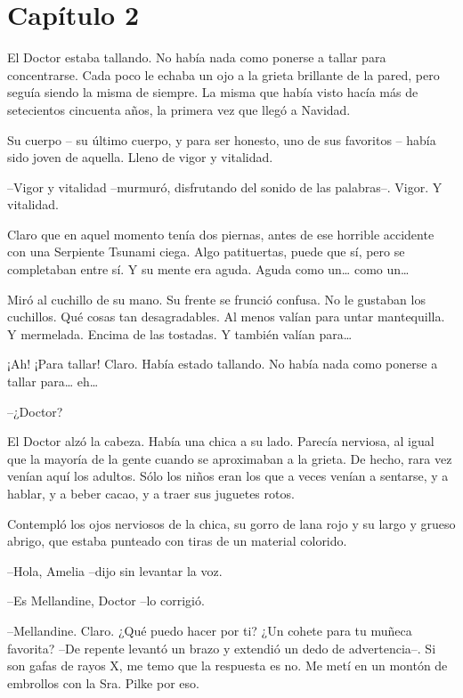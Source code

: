 \chapter*{Capítulo 2}

El Doctor estaba tallando. No había nada como ponerse a tallar para concentrarse. Cada poco le echaba un ojo a la grieta brillante de la pared, pero seguía siendo la misma de siempre. La misma que había visto hacía más de setecientos cincuenta años, la primera vez que llegó a Navidad.

Su cuerpo – su último cuerpo, y para ser honesto, uno de sus favoritos – había sido joven de aquella. Lleno de vigor y vitalidad.

--Vigor y vitalidad --murmuró, disfrutando del sonido de las palabras--. Vigor. Y vitalidad.

Claro que en aquel momento tenía dos piernas, antes de ese horrible accidente con una Serpiente Tsunami ciega. Algo patituertas, puede que sí, pero se completaban entre sí. Y su mente era aguda. Aguda como un… como un…

Miró al cuchillo de su mano. Su frente se frunció confusa. No le gustaban los cuchillos. Qué cosas tan desagradables. Al menos valían para untar mantequilla. Y mermelada. Encima de las tostadas. Y también valían para…

¡Ah! ¡Para tallar! Claro. Había estado tallando. No había nada como ponerse a tallar para… eh…

--¿Doctor?

El Doctor alzó la cabeza. Había una chica a su lado. Parecía nerviosa, al igual que la mayoría de la gente cuando se aproximaban a la grieta. De hecho, rara vez venían aquí los adultos. Sólo los niños eran los que a veces venían a sentarse, y a hablar, y a beber cacao, y a traer sus juguetes rotos.

Contempló los ojos nerviosos de la chica, su gorro de lana rojo y su largo y grueso abrigo, que estaba punteado con tiras de un material colorido.

--Hola, Amelia --dijo sin levantar la voz.

--Es Mellandine, Doctor --lo corrigió.

--Mellandine. Claro. ¿Qué puedo hacer por ti? ¿Un cohete para tu muñeca favorita? --De repente levantó un brazo y extendió un dedo de advertencia--. Si son gafas de rayos X, me temo que la respuesta es no. Me metí en un montón de embrollos con la Sra. Pilke por eso.

